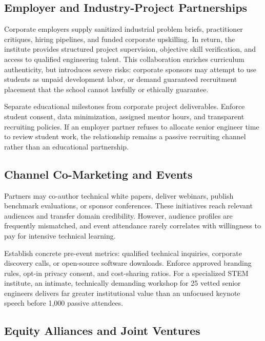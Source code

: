 \subsection{Employer and Industry-Project Partnerships}
\label{sec:employer_industry_partnerships}

Corporate employers supply sanitized industrial problem briefs, practitioner critiques, hiring pipelines, and funded corporate upskilling. In return, the institute provides structured project supervision, objective skill verification, and access to qualified engineering talent. This collaboration enriches curriculum authenticity, but introduces severe risks: corporate sponsors may attempt to use students as unpaid development labor, or demand guaranteed recruitment placement that the school cannot lawfully or ethically guarantee.

Separate educational milestones from corporate project deliverables. Enforce student consent, data minimization, assigned mentor hours, and transparent recruiting policies. If an employer partner refuses to allocate senior engineer time to review student work, the relationship remains a passive recruiting channel rather than an educational partnership.

\subsection{Channel Co-Marketing and Events}
\label{sec:co_marketing_and_events}

Partners may co-author technical white papers, deliver webinars, publish benchmark evaluations, or sponsor conferences. These initiatives reach relevant audiences and transfer domain credibility. However, audience profiles are frequently mismatched, and event attendance rarely correlates with willingness to pay for intensive technical learning.

Establish concrete pre-event metrics: qualified technical inquiries, corporate discovery calls, or open-source software downloads. Enforce approved branding rules, opt-in privacy consent, and cost-sharing ratios. For a specialized STEM institute, an intimate, technically demanding workshop for 25 vetted senior engineers delivers far greater institutional value than an unfocused keynote speech before 1,000 passive attendees.

\subsection{Equity Alliances and Joint Ventures}
\label{sec:equity_alliances_and_jvs}

